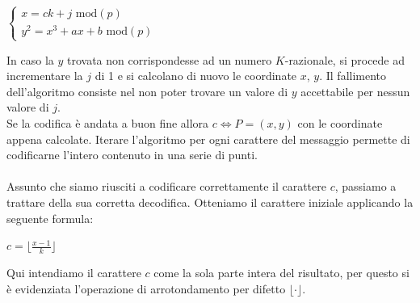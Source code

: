 \documentclass[a4paper,12pt]{tesiinfo}
\newcommand\ddfrac[2]{\frac{\displaystyle #1}{\displaystyle #2}}
\begin{document}
\begin{center}
$\begin{cases}
 x = ck + j \text{ mod}(p)\\
 y^2 = x^3 + ax + b \text{ mod}(p)
 \end{cases}$
\end{center}
In caso la $y$ trovata non corrispondesse ad un numero $K$-razionale, si procede ad incrementare la $j$ di 1 e si calcolano di nuovo le coordinate $x$, $y$. Il fallimento dell'algoritmo consiste nel non poter trovare un valore di $y$ accettabile per nessun valore di $j$.
\\
Se la codifica \`e andata a buon fine allora $c \iff P=(x, y)$ con le coordinate appena calcolate. Iterare l'algoritmo per ogni carattere del messaggio permette di codificarne l'intero contenuto in una serie di punti. 
\\
\\
Assunto che siamo riusciti a codificare correttamente il carattere $c$, passiamo a trattare della sua corretta decodifica. Otteniamo il carattere iniziale applicando la seguente formula:
\begin{center}
 $c = \Big \lfloor \ddfrac{x-1}{k} \Big \rfloor$
\end{center}
Qui intendiamo il carattere $c$ come la sola parte intera del risultato, per questo si \`e evidenziata l'operazione di arrotondamento per difetto $\lfloor \cdot \rfloor$.
%
%
%
%
%
%
%
\end{document}
